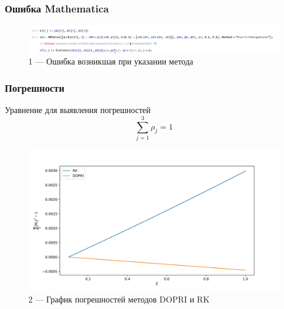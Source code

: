 \documentclass[utf8,9pt,mathserif,usepdftitle=false]{beamer}
\begin{document}
\begin{frame}
  \frametitle{Ошибка Mathematica}%
\begin{figure}[h!]
\centering

\includegraphics[width=1\linewidth]{Снимок.jpg}

\caption{1 — Ошибка возникшая при указании метода}

\label{fig:mpr}

\end{figure}
\end{frame}

\begin{frame}
  \frametitle{Погрешности}%
Уравнение для выявления погрешностей
\begin{equation*}
   \sum_{j=1}^3\rho_j=1
  \end{equation*}
\begin{figure}[h!]
\centering

\includegraphics[width=0.8\linewidth]{1conrol_c.jpg}

\caption{2 — График погрешностей методов DOPRI и RK}

\label{fig:mpr}

\end{figure}
\end{frame}
\end{document}
